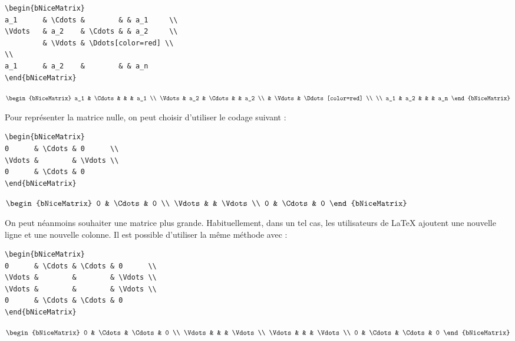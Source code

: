 \documentclass[dvipsnames]{article}%
\def\interitem{\vspace{7mm plus 2 mm minus 3mm}}
\begin{document}
\bigskip
\begin{BVerbatim}[baseline=c,boxwidth=10cm]
\begin{bNiceMatrix}
a_1      & \Cdots &        & & a_1     \\
\Vdots   & a_2    & \Cdots & & a_2     \\
         & \Vdots & \Ddots[color=red] \\
\\
a_1      & a_2    &        & & a_n 
\end{bNiceMatrix}
\end{BVerbatim}
$\begin{bNiceMatrix}
a_1      & \Cdots &        & & a_1   \\
\Vdots   & a_2    & \Cdots & & a_2   \\
         & \Vdots & \Ddots[color=red] \\
\\
a_1      & a_2    &        & & a_n 
\end{bNiceMatrix}$




\interitem Pour représenter la matrice nulle, on peut choisir d'utiliser le
codage suivant :\par\nobreak

\bigskip
\begin{BVerbatim}[baseline=c,boxwidth=10cm]
\begin{bNiceMatrix}
0      & \Cdots & 0      \\
\Vdots &        & \Vdots \\
0      & \Cdots & 0 
\end{bNiceMatrix}
\end{BVerbatim}
$\begin{bNiceMatrix}
0      & \Cdots & 0      \\
\Vdots &        & \Vdots \\
0      & \Cdots & 0 
\end{bNiceMatrix}$

\bigskip
On peut néanmoins souhaiter une matrice plus grande. Habituellement, dans un tel
cas, les utilisateurs de LaTeX ajoutent une nouvelle ligne et une nouvelle
colonne. Il est possible d'utiliser la même méthode avec 
:\par\nobreak

\bigskip
\begin{BVerbatim}[baseline=c,boxwidth=10cm]
\begin{bNiceMatrix}
0      & \Cdots & \Cdots & 0      \\
\Vdots &        &        & \Vdots \\
\Vdots &        &        & \Vdots \\
0      & \Cdots & \Cdots & 0 
\end{bNiceMatrix}
\end{BVerbatim}
$\begin{bNiceMatrix}
0      & \Cdots & \Cdots & 0      \\
\Vdots &        &        & \Vdots \\
\Vdots &        &        & \Vdots \\
0      & \Cdots & \Cdots & 0 
\end{bNiceMatrix}$
\end{document}
